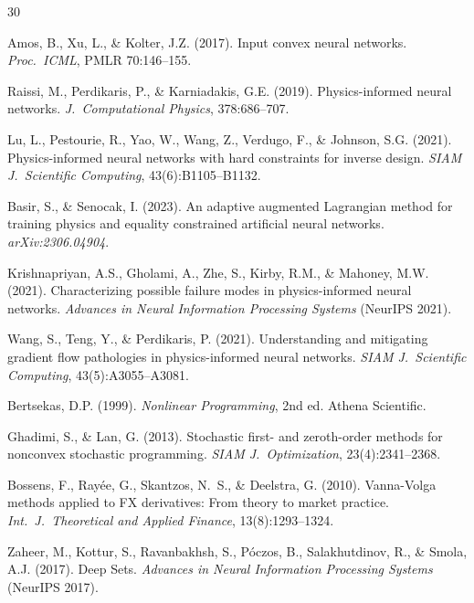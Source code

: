 \documentclass[11pt,a4paper]{article}
\begin{document}
\begin{thebibliography}{30}

Amos, B., Xu, L., \& Kolter, J.Z. (2017).
Input convex neural networks.
\emph{Proc.\ ICML}, PMLR 70:146--155.


Raissi, M., Perdikaris, P., \& Karniadakis, G.E. (2019).
Physics-informed neural networks.
\emph{J.\ Computational Physics}, 378:686--707.

Lu, L., Pestourie, R., Yao, W., Wang, Z., Verdugo, F., \& Johnson, S.G. (2021).
Physics-informed neural networks with hard constraints for inverse design.
\emph{SIAM J.\ Scientific Computing}, 43(6):B1105--B1132.

Basir, S., \& Senocak, I. (2023).
An adaptive augmented Lagrangian method for training physics and equality constrained artificial neural networks.
\emph{arXiv:2306.04904}.

Krishnapriyan, A.S., Gholami, A., Zhe, S., Kirby, R.M., \& Mahoney, M.W. (2021).
Characterizing possible failure modes in physics-informed neural networks.
\emph{Advances in Neural Information Processing Systems} (NeurIPS 2021).

Wang, S., Teng, Y., \& Perdikaris, P. (2021).
Understanding and mitigating gradient flow pathologies in physics-informed neural networks.
\emph{SIAM J.\ Scientific Computing}, 43(5):A3055--A3081.


Bertsekas, D.P. (1999).
\emph{Nonlinear Programming}, 2nd ed.
Athena Scientific.

Ghadimi, S., \& Lan, G. (2013).
Stochastic first- and zeroth-order methods for nonconvex stochastic programming.
\emph{SIAM J.\ Optimization}, 23(4):2341--2368.

Bossens, F., Ray\'ee, G., Skantzos, N.~S., \& Deelstra, G. (2010).
Vanna-Volga methods applied to FX derivatives: From theory to market practice.
\emph{Int.\ J.\ Theoretical and Applied Finance}, 13(8):1293--1324.


Zaheer, M., Kottur, S., Ravanbakhsh, S., P\'oczos, B., Salakhutdinov, R., \& Smola, A.J. (2017).
Deep Sets.
\emph{Advances in Neural Information Processing Systems} (NeurIPS 2017).

\end{thebibliography}
\end{document}
